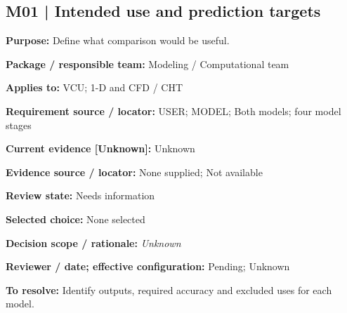 \documentclass[11pt]{article}
\begin{document}
\par\noindent\begin{minipage}{\textwidth}\small\setlength{\parskip}{2pt}
\subsection*{M01 | Intended use and prediction targets}
\textbf{Purpose:} Define what comparison would be useful.\par
\textbf{Package / responsible team:} Modeling / Computational team\par
\textbf{Applies to:} VCU; 1-D and CFD / CHT\par
\textbf{Requirement source / locator:} USER; MODEL; Both models; four model stages\par
\textbf{Current evidence [Unknown]:} Unknown\par
\textbf{Evidence source / locator:} None supplied; Not available\par
\textbf{Review state:} Needs information\par
\textbf{Selected choice:} None selected\par
\textbf{Decision scope / rationale:} \textit{Unknown}\par
\textbf{Reviewer / date; effective configuration:} Pending; Unknown\par
\textbf{To resolve:} Identify outputs, required accuracy and excluded uses for each model.\par
\end{minipage}\par\vspace{5pt}
\end{document}

